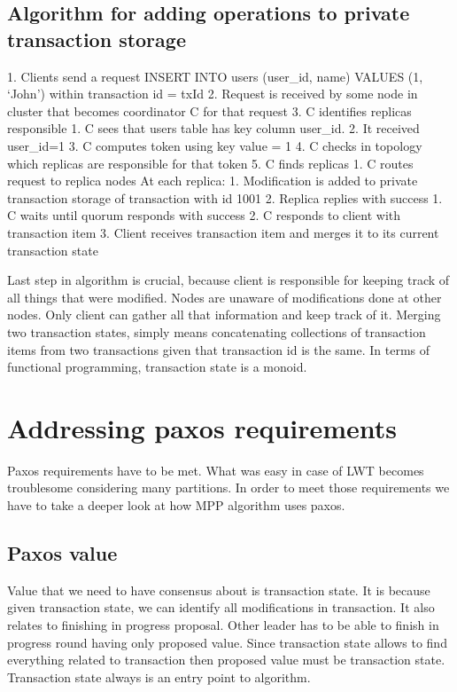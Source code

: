 \subsection{Algorithm for adding operations to private transaction storage}


1. Clients send a request INSERT INTO users (user_id, name) VALUES (1, ‘John’) within transaction id = txId
2. Request is received by some node in cluster that becomes coordinator C for that request
3. C identifies replicas responsible
   1. C sees that users table has key column user_id. 
   2. It received user_id=1
   3. C computes token using key value = 1 
   4. C checks in topology which replicas are responsible for that token
   5. C finds replicas
1. C routes request to replica nodes
At each replica:
   1. Modification is added to private transaction storage of transaction with id 1001
   2. Replica replies with success
1. C waits until quorum responds with success
2. C responds to client with transaction item
3. Client receives transaction item and merges it to its current transaction state


Last step in algorithm is crucial, because client is responsible for keeping track of all things that were modified. Nodes are unaware of modifications done at other nodes. Only client can gather all that information and keep track of it.
        Merging two transaction states, simply means concatenating collections of transaction items from two transactions given that transaction id is the same. In terms of functional programming, transaction state is a monoid.




\section{Addressing paxos requirements}
Paxos requirements have to be met. What was easy in case of LWT becomes troublesome considering many partitions. In order to meet those requirements we have to take a deeper look at how MPP algorithm uses paxos.


\subsection{Paxos value}
Value that we need to have consensus about is transaction state. It is because given transaction state, we can identify all modifications in transaction. It also relates to finishing in progress proposal. Other leader has to be able to finish in progress round having only proposed value. Since transaction state allows to find everything related to transaction then proposed value must be transaction state. Transaction state always is an entry point to algorithm.


